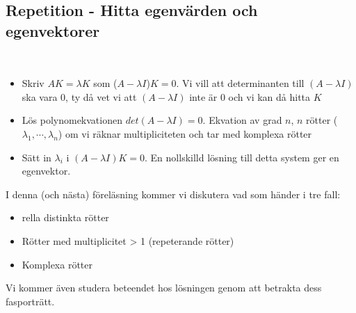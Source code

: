 \subsection{Repetition - Hitta egenvärden och egenvektorer}\hfill\\
\par\bigskip
\begin{itemize}
  \item Skriv $AK=\lambda K$ som ($A-\lambda I$)$K=0$. Vi vill att determinanten till $(A-\lambda I)$ ska vara 0, ty då vet vi att $(A-\lambda I)$ inte är 0 och vi kan då hitta $K$
  \item Lös polynomekvationen $det(A-\lambda I)=0$. Ekvation av grad $n$, $n$ rötter ($\lambda_1,\cdots, \lambda_n$) om vi räknar multipliciteten och tar med komplexa rötter
  \item Sätt in $\lambda_i$ i $(A-\lambda I)K=0$. En nollskilld lösning till detta system ger en egenvektor.
\end{itemize}
\par\bigskip
\noindent I denna (och nästa) föreläsning kommer vi diskutera vad som händer i tre fall:
\begin{itemize}
  \item rella distinkta rötter
  \item Rötter med multiplicitet > 1 (repeterande rötter)
  \item Komplexa rötter
\end{itemize}
\par\bigskip
\noindent Vi kommer även studera beteendet hos lösningen genom att betrakta dess fasporträtt.
\par\bigskip
